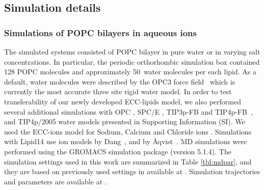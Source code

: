 \documentclass[aip,jcp,twocolumn]{revtex4}
\begin{document}
\subsection{Simulation details}

\subsubsection{Simulations of POPC bilayers in aqueous ions}
The simulated systems consisted of POPC bilayer in pure water
or in varying salt concentrations.
In particular, the periodic orthorhombic simulation box contained 
128 POPC molecules and approximately 50~water molecules per each lipid.
As a default, water molecules were described by the OPC3 force field~\cite{Izadi16} 
which is currently the most accurate three site rigid water model. 
In order to test transferability of our newly developed ECC-lipids model, 
we also performed several additional simulations with 
OPC \cite{Izadi14}, SPC/E \cite{Berendsen1987}, TIP3p-FB and TIP4p-FB~\cite{Wang2014}, and TIP4p/2005 \cite{Abascal2005} water models
presented in Supporting Information (SI). 
We used the ECC-ions model for Sodium, Calcium and Chloride ions \cite{jungwirth17-new-paper-to-be-published, kohagen16, Pluharova2014}.  %
Simulations with Lipid14 use ion models by Dang~\cite{smith94,chang1999,dang2006}, and by \AA{}qvist~\cite{aqvist90}. 
MD simulations were performed using the GROMACS \cite{Abraham15} simulation package (version 5.1.4).  
The simulation settings used in this work are 
summarized in Table \ref{tbl:mdpar}, 
and they are based on previously used settings in \cite{catte16} available at \cite{lipid14POPC0mMNaClfiles}.
Simulation trajectories and parameters are available at \cite{??} . 
\end{document}
